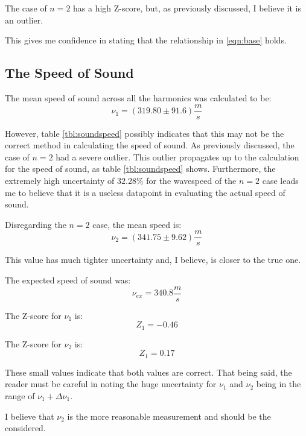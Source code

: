 \documentclass[conference]{IEEEtran}
\begin{document}
The case of $n=2$ has a high Z-score, but, as previously discussed, I believe
it is an outlier.

This gives me confidence in stating that the relationship in \eqref{eqn:base}
holds.

\subsection{The Speed of Sound}

The mean speed of sound across all the harmonics was calculated to be:
\begin{equation}
    \nu_1 = (319.80 \pm 91.6) \si{\frac{m}{s}}
\end{equation}

However, table \ref{tbl:soundspeed} possibly indicates that this may not be the
correct method in calculating the speed of sound.  As previously discussed, the
case of $n=2$ had a severe outlier. This outlier propagates up to the
calculation for the speed of sound, as table \ref{tbl:soundspeed} shows.
Furthermore, the extremely high uncertainty of $32.28\%$ for the wavespeed of
the $n=2$ case leads me to believe that it is a useless datapoint in evaluating
the actual speed of sound.

Disregarding the $n=2$ case, the mean speed is:
\begin{equation*}
    \nu_2 = (341.75 \pm 9.62) \si{\frac{m}{s}}
\end{equation*}

This value has much tighter uncertainty and, I believe, is closer to the true
one.

The expected speed of sound was:
\begin{equation*}
    \nu_{ex} = 340.8 \si{\frac{m}{s}}
\end{equation*}

The Z-score for $\nu_1$ is:
\begin{equation*}
    Z_1 = -0.46
\end{equation*}

The Z-score for $\nu_2$ is:
\begin{equation*}
    Z_1 = 0.17
\end{equation*}

These small values indicate that both values are correct. That being said, the
reader must be careful in noting the huge uncertainty for $\nu_1$ and $\nu_2$
being in the range of $\nu_1 + \Delta \nu_1$.

I believe that $\nu_2$ is the more reasonable measurement and should be the
considered.
\end{document}
